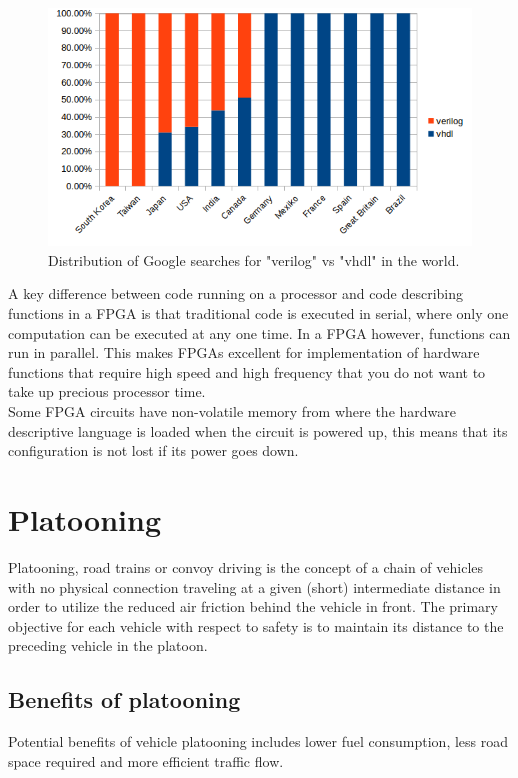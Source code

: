 \begin{figure}[H]
\centering
\includegraphics[width=\textwidth]{./img/vhdlverilog.png}
\caption{Distribution of Google searches for "verilog" vs "vhdl" in the world.}\label{fig:vhdlverilog}
\end{figure}

A key difference between code running on a processor and code describing functions in a FPGA is that traditional code is executed in serial, where only one computation can be executed at any one time. In a FPGA however, functions can run in parallel. This makes FPGAs excellent for implementation of hardware functions that require high speed and high frequency that you do not want to take up precious processor time.\\

Some FPGA circuits have non-volatile memory from where the hardware descriptive language is loaded when the circuit is powered up, this means that its configuration is not lost if its power goes down.

\section{Platooning}
Platooning, road trains or convoy driving is the concept of a chain of vehicles with no physical connection traveling at a given (short) intermediate distance in order to utilize the reduced air friction behind the vehicle in front. The primary objective for each vehicle with respect to safety is to maintain its distance to the preceding vehicle in the platoon.

\subsection{Benefits of platooning}
Potential benefits of vehicle platooning includes lower fuel consumption, less road space required and more efficient traffic flow.\\ 

